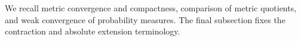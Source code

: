 We recall metric convergence and compactness,
comparison of metric quotients,
and weak convergence of probability measures.
The final subsection fixes the contraction and absolute extension terminology.
